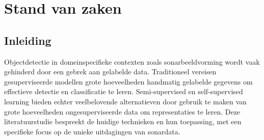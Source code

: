 \chapter{Stand van zaken}
\label{ch:stand-van-zaken}

\section{Inleiding}

Objectdetectie in domeinspecifieke contexten zoals sonarbeeldvorming wordt vaak gehinderd door een gebrek aan gelabelde data. Traditioneel vereisen gesuperviseerde modellen grote hoeveelheden handmatig gelabelde gegevens om effectieve detectie en classificatie te leren. Semi-supervised en self-supervised learning bieden echter veelbelovende alternatieven door gebruik te maken van grote hoeveelheden ongesuperviseerde data om representaties te leren. Deze literatuurstudie bespreekt de huidige technieken en hun toepassing, met een specifieke focus op de unieke uitdagingen van sonardata.










